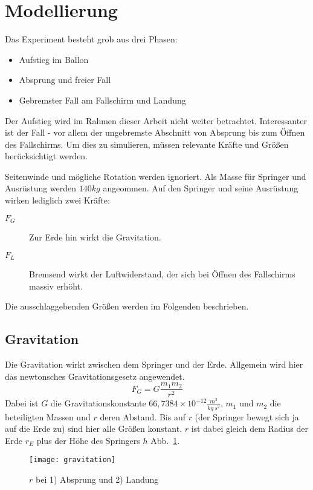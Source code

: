 \section{Modellierung}

Das Experiment besteht grob aus drei Phasen:
\begin{itemize}
  \item Aufstieg im Ballon
  \item Absprung und freier Fall
  \item Gebremster Fall am Fallschirm und Landung
\end{itemize}
Der Aufstieg wird im Rahmen dieser Arbeit nicht weiter betrachtet.
Interessanter ist der Fall - vor allem der ungebremste Abschnitt von Absprung bis zum Öffnen des Fallschirms.
Um dies zu simulieren, müssen relevante Kräfte und Größen berücksichtigt werden. %

Seitenwinde und mögliche Rotation werden ignoriert.
Als Masse für Springer und Ausrüstung werden $140kg$ angeommen.
Auf den Springer und seine Ausrüstung wirken lediglich zwei Kräfte:
\begin{description}
  \item[$F_G$] Zur Erde hin wirkt die Gravitation.
  \item[$F_L$] Bremsend wirkt der Luftwiderstand, der sich bei Öffnen des Fallschirms massiv erhöht.
\end{description}

Die ausschlaggebenden Größen werden im Folgenden beschrieben.

\subsection{Gravitation}
Die Gravitation wirkt zwischen dem Springer und der Erde.
Allgemein wird hier das newtonsches Gravitationsgesetz angewendet.
\begin{equation}
F_G=G \frac{m_1 m_2}{r^2}
\end{equation}
Dabei ist $G$ die Gravitationskonstante $66,7384\times 10^{-12} \frac{m^3}{kg\ s^2}$, $m_1$ und $m_2$ die beteiligten Massen und $r$ deren Abstand.
Bis auf $r$ (der Springer bewegt sich ja auf die Erde zu) sind hier alle Größen konstant.
$r$ ist dabei gleich dem Radius der Erde $r_E$ plus der Höhe des Springers $h$ \vgl Abb.~\ref{fig:gravitation}.
\begin{figure}[h]
  \centering
  \texttt{[image: gravitation]}
  \caption{$r$ bei 1) Absprung und 2) Landung}
  \label{fig:gravitation}
\end{figure}

